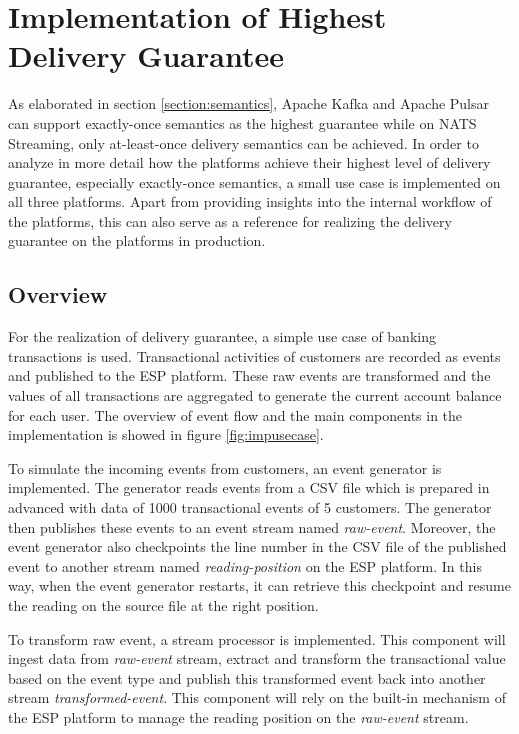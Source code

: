 \chapter{Implementation of Highest Delivery Guarantee} \label{chap:implementation}
As elaborated in section \ref{section:semantics}, Apache Kafka and Apache Pulsar can support exactly-once semantics as the highest guarantee while on NATS Streaming, only at-least-once delivery semantics can be achieved. In order to analyze in more detail how the platforms achieve their highest level of delivery guarantee, especially exactly-once semantics, a small use case is implemented on all three platforms. Apart from providing insights into the internal workflow of the platforms, this can also serve as a reference for realizing the delivery guarantee on the platforms in production. 
\section{Overview}
For the realization of delivery guarantee, a simple use case of banking transactions is used. Transactional activities of customers are recorded as events and published to the ESP platform. These raw events are transformed and the values of all transactions are aggregated to generate the current account balance for each user. The overview of event flow and the main components in the implementation is showed in figure \ref{fig:impusecase}.

To simulate the incoming events from customers, an event generator is implemented. The generator reads events from a CSV file which is prepared in advanced with data of 1000 transactional events of 5 customers. The generator then publishes these events to an event stream named \emph{raw-event}. Moreover, the event generator also checkpoints the line number in the CSV file of the published event to another stream named \emph{reading-position} on the ESP platform. In this way, when the event generator restarts, it can retrieve this checkpoint and resume the reading on the source file at the right position. 

To transform raw event, a stream processor is implemented. This component will ingest data from \emph{raw-event} stream, extract and transform the transactional value based on the event type and publish this transformed event back into another stream \emph{transformed-event}. This component will rely on the built-in mechanism of the ESP platform to manage the reading position on the \emph{raw-event} stream.




